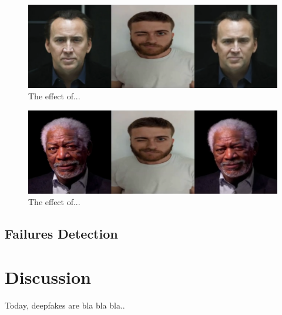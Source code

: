 \documentclass[english,12pt]{article}
\begin{document}
\begin{figure}[htb]
  \begin{centering}
      \includegraphics[scale=0.29]{images/Oren_wink_cage.PNG}
  \par\end{centering}
  \caption{\label{fig:Oren_wink_cage}The effect of...}
\end{figure}

\begin{figure}[htb]
  \begin{centering}
      \includegraphics[scale=0.29]{images/Oren_wink_freeman.PNG}
  \par\end{centering}
  \caption{\label{fig:Oren_wink_freeman}The effect of...}
\end{figure}

\subsection{Failures Detection}



\section{Discussion} \label{discussion}

Today, deepfakes are bla bla bla..

\pagebreak{}




\end{document}
